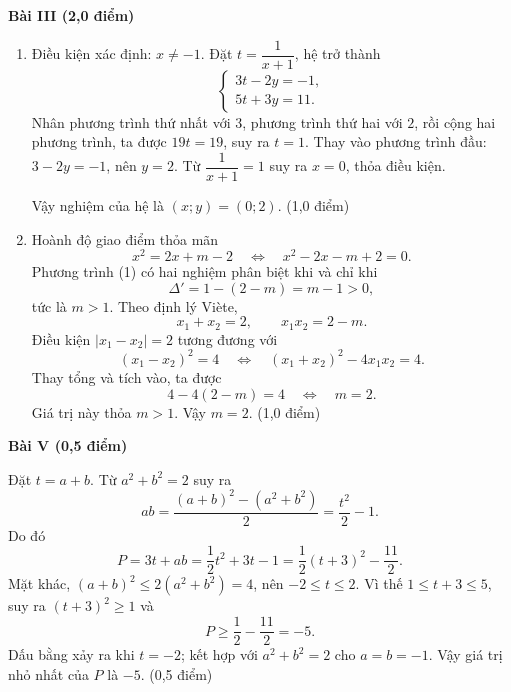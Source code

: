 \documentclass[12pt,a4paper]{article}
\begin{document}
\textbf{Bài III (2,0 điểm)}

\begin{enumerate}[label=\arabic*)]
  \item Điều kiện xác định: $x\neq-1$. Đặt $t=\dfrac{1}{x+1}$, hệ trở thành
  \[
  \begin{cases}
  3t-2y=-1,\\
  5t+3y=11.
  \end{cases}
  \]
  Nhân phương trình thứ nhất với $3$, phương trình thứ hai với $2$, rồi cộng hai phương trình, ta được $19t=19$, suy ra $t=1$. Thay vào phương trình đầu: $3-2y=-1$, nên $y=2$. Từ $\dfrac1{x+1}=1$ suy ra $x=0$, thỏa điều kiện.\par
  Vậy nghiệm của hệ là $(x;y)=(0;2)$. \hfill (1,0 điểm)

  \item Hoành độ giao điểm thỏa mãn
  \[
  x^2=2x+m-2
  \quad\Longleftrightarrow\quad
  x^2-2x-m+2=0. \tag{1}
  \]
  Phương trình (1) có hai nghiệm phân biệt khi và chỉ khi
  \[
  \Delta'=1-(2-m)=m-1>0,
  \]
  tức là $m>1$. Theo định lý Viète,
  \[
  x_1+x_2=2,\qquad x_1x_2=2-m.
  \]
  Điều kiện $|x_1-x_2|=2$ tương đương với
  \[
  (x_1-x_2)^2=4
  \quad\Longleftrightarrow\quad
  (x_1+x_2)^2-4x_1x_2=4.
  \]
  Thay tổng và tích vào, ta được
  \[
  4-4(2-m)=4
  \quad\Longleftrightarrow\quad m=2.
  \]
  Giá trị này thỏa $m>1$. Vậy $m=2$. \hfill (1,0 điểm)
\end{enumerate}

\textbf{Bài V (0,5 điểm)}

Đặt $t=a+b$. Từ $a^2+b^2=2$ suy ra
\[
ab=\frac{(a+b)^2-(a^2+b^2)}{2}=\frac{t^2}{2}-1.
\]
Do đó
\[
P=3t+ab=\frac12t^2+3t-1
 =\frac12(t+3)^2-\frac{11}{2}.
\]
Mặt khác, $(a+b)^2\leq2(a^2+b^2)=4$, nên $-2\leq t\leq2$. Vì thế $1\leq t+3\leq5$, suy ra $(t+3)^2\geq1$ và
\[
P\geq\frac12-\frac{11}{2}=-5.
\]
Dấu bằng xảy ra khi $t=-2$; kết hợp với $a^2+b^2=2$ cho $a=b=-1$. Vậy giá trị nhỏ nhất của $P$ là $-5$. \hfill (0,5 điểm)
\end{document}
